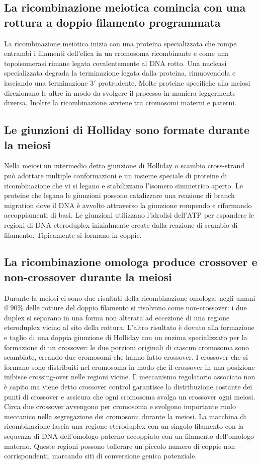 \subsection{La ricombinazione meiotica comincia con una rottura a doppio filamento programmata}
La ricombinazione meiotica inizia con una proteina specializzata che rompe entrambi i filamenti dell'elica in un cromosoma ricombinante e come una topoisomerasi rimane legata 
covalentemente al DNA rotto. Una nucleasi specializzata degrada la terminazione legata dalla proteina, rimuovendola e lasciando una terminazione $3'$ protrudente. Molte proteine 
specifiche alla meiosi direzionano le altre in modo da svolgere il processo in maniera leggermente diversa. Inoltre la ricombinazione avviene tra cromosomi materni e paterni.
\subsection{Le giunzioni di Holliday sono formate durante la meiosi}
Nella meiosi un intermedio detto giunzione di Holliday o scambio cross-strand pu\`o adottare multiple conformazioni e un insieme speciale di proteine di ricombinazione che vi si legano
e stabilizzano l'isomero simmetrico aperto. Le proteine che legano le giunzioni possono catalizzare una reazione di branch migration dove il DNA \`e avvolto attraverso la giunzione 
rompendo e riformando accoppiamenti di basi. Le giunzioni utilizzano l'idrolisi dell'ATP per espandere le regioni di DNA eteroduplex inizialmente create dalla reazione di scambio di 
filamento. Tipicamente si formano in coppie.
\subsection{La ricombinazione omologa produce crossover e non-crossover durante la meiosi}
Durante la meiosi ci sono due risultati della ricombinazione omologa: negli umani il $90\%$ delle rotture del doppio filamento si risolvono come non-crossover: i due duplex si separano
in una forma non alterata ad eccezione di una regione eteroduplex vicino al sito della rottura. L'altro risultato \`e dovuto alla formazione e taglio di una doppia giunzione di Holliday 
con un enzima specializzato per la formazione di un crossover: le due porzioni originali di ciascun cromosoma sono scambiate, creando due cromosomi che hanno fatto crossover. I 
crossover che si formano sono distribuiti nel cromosoma in modo che il crossover in una posizione inibisce crossing-over nelle regioni vicine. Il meccanismo regolatorio associato non
\`e capito ma viene detto crossover control garantisce la distribuzione costante dei punti di crossover e assicura che ogni cromosoma svolga un crossover ogni meiosi. Circa due 
crossover avvengono per cromosoma e svolgono importante ruolo meccanico nella segregazione dei cromosomi durante la meiosi. La macchina di ricombinazione lascia una regione eteroduplex
con un singolo filamento con la sequenza di DNA dell'omologo paterno accoppiato con un filamento dell'omologo materno. Queste regioni possono tollerare un piccolo numero di coppie non
corrispondenti, marcando siti di conversione genica potenziale. 
